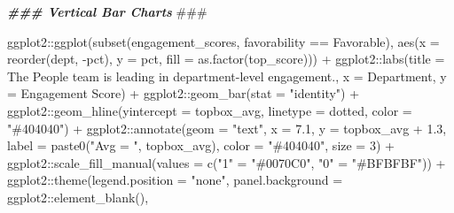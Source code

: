 \documentclass[
]{book}
\newenvironment{Shaded}{\begin{snugshade}}{\end{snugshade}}
\newcommand{\AlertTok}[1]{\textcolor[rgb]{0.94,0.16,0.16}{#1}}
\newcommand{\AttributeTok}[1]{\textcolor[rgb]{0.77,0.63,0.00}{#1}}
\newcommand{\DecValTok}[1]{\textcolor[rgb]{0.00,0.00,0.81}{#1}}
\newcommand{\DocumentationTok}[1]{\textcolor[rgb]{0.56,0.35,0.01}{\textbf{\textit{#1}}}}
\newcommand{\FloatTok}[1]{\textcolor[rgb]{0.00,0.00,0.81}{#1}}
\newcommand{\FunctionTok}[1]{\textcolor[rgb]{0.00,0.00,0.00}{#1}}
\newcommand{\NormalTok}[1]{#1}
\newcommand{\OtherTok}[1]{\textcolor[rgb]{0.56,0.35,0.01}{#1}}
\newcommand{\SpecialCharTok}[1]{\textcolor[rgb]{0.00,0.00,0.00}{#1}}
\newcommand{\StringTok}[1]{\textcolor[rgb]{0.31,0.60,0.02}{#1}}
\begin{document}
\begin{Shaded}
\begin{Highlighting}[]
\DocumentationTok{\#\#\# Vertical Bar Charts }\AlertTok{\#\#\#}

\NormalTok{ggplot2}\SpecialCharTok{::}\FunctionTok{ggplot}\NormalTok{(}\FunctionTok{subset}\NormalTok{(engagement\_scores, favorability }\SpecialCharTok{==} \StringTok{\textquotesingle{}Favorable\textquotesingle{}}\NormalTok{), }\FunctionTok{aes}\NormalTok{(}\AttributeTok{x =} \FunctionTok{reorder}\NormalTok{(dept, }\SpecialCharTok{{-}}\NormalTok{pct), }\AttributeTok{y =}\NormalTok{ pct, }\AttributeTok{fill =} \FunctionTok{as.factor}\NormalTok{(top\_score))) }\SpecialCharTok{+}
\NormalTok{ggplot2}\SpecialCharTok{::}\FunctionTok{labs}\NormalTok{(}\AttributeTok{title =} \StringTok{\textquotesingle{}The People team is leading in department{-}level engagement.\textquotesingle{}}\NormalTok{, }\AttributeTok{x =} \StringTok{\textquotesingle{}Department\textquotesingle{}}\NormalTok{, }\AttributeTok{y =} \StringTok{\textquotesingle{}Engagement Score\textquotesingle{}}\NormalTok{) }\SpecialCharTok{+}
\NormalTok{ggplot2}\SpecialCharTok{::}\FunctionTok{geom\_bar}\NormalTok{(}\AttributeTok{stat =} \StringTok{"identity"}\NormalTok{) }\SpecialCharTok{+}
\NormalTok{ggplot2}\SpecialCharTok{::}\FunctionTok{geom\_hline}\NormalTok{(}\AttributeTok{yintercept =}\NormalTok{ topbox\_avg, }\AttributeTok{linetype =} \StringTok{\textquotesingle{}dotted\textquotesingle{}}\NormalTok{, }\AttributeTok{color =} \StringTok{"\#404040"}\NormalTok{) }\SpecialCharTok{+} 
\NormalTok{ggplot2}\SpecialCharTok{::}\FunctionTok{annotate}\NormalTok{(}\AttributeTok{geom =} \StringTok{"text"}\NormalTok{, }\AttributeTok{x =} \FloatTok{7.1}\NormalTok{, }\AttributeTok{y =}\NormalTok{ topbox\_avg }\SpecialCharTok{+} \FloatTok{1.3}\NormalTok{, }\AttributeTok{label =} \FunctionTok{paste0}\NormalTok{(}\StringTok{"Avg = "}\NormalTok{, topbox\_avg), }\AttributeTok{color =} \StringTok{"\#404040"}\NormalTok{, }\AttributeTok{size =} \DecValTok{3}\NormalTok{) }\SpecialCharTok{+}
\NormalTok{ggplot2}\SpecialCharTok{::}\FunctionTok{scale\_fill\_manual}\NormalTok{(}\AttributeTok{values =} \FunctionTok{c}\NormalTok{(}\StringTok{"1"} \OtherTok{=} \StringTok{"\#0070C0"}\NormalTok{,}
                                      \StringTok{"0"} \OtherTok{=} \StringTok{"\#BFBFBF"}\NormalTok{)) }\SpecialCharTok{+}
\NormalTok{ggplot2}\SpecialCharTok{::}\FunctionTok{theme}\NormalTok{(}\AttributeTok{legend.position =} \StringTok{"none"}\NormalTok{,}
               \AttributeTok{panel.background =}\NormalTok{ ggplot2}\SpecialCharTok{::}\FunctionTok{element\_blank}\NormalTok{(),}

\end{Highlighting}
\end{Shaded}
\end{document}
